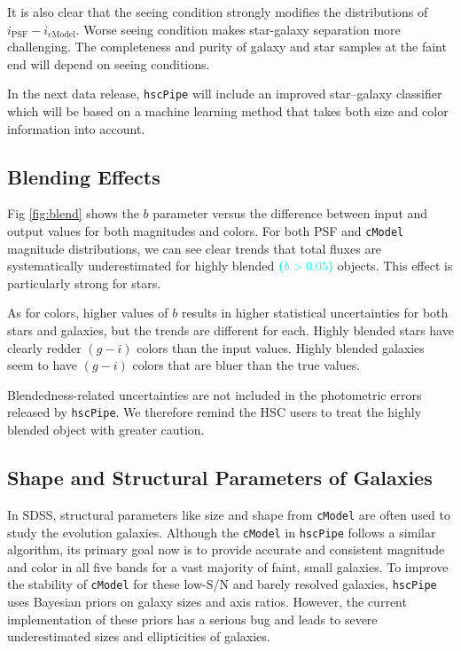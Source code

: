 \documentclass[useamsfonts]{pasj01}
\def\hscpipe{\texttt{hscPipe}}
\def\cmodel{\texttt{cModel}}
\def\s2n{{$\mathrm{S}/\mathrm{N}$}}
\newcommand{\song}[1]{\textcolor{cyan} {\textbf{#1}}}
\begin{document}
    It is also clear that the seeing condition strongly modifies the distributions
    of $i_{\mathrm{PSF}}-i_{\mathrm{cModel}}$. 
    Worse seeing condition makes star-galaxy separation more challenging. 
    The completeness and purity of galaxy and star samples at the faint end will 
    depend on seeing conditions.  

    In the next data release, \hscpipe{} will include an improved star--galaxy 
    classifier which will be based on a machine learning method that takes both 
    size and color information into account. 

\subsection{Blending Effects}
    \label{ssec:blendedness}

    Fig \ref{fig:blend} shows the $b$ parameter versus the difference between input and
    output values for both magnitudes and colors. 
    For both PSF and \cmodel{} magnitude distributions, we can see clear trends that 
    total fluxes are systematically underestimated for highly blended \song{($b>0.05$)} 
    objects.
    This effect is particularly strong for stars.
    
    As for colors, higher values of $b$ results in higher statistical uncertainties 
    for both stars and galaxies, but the trends are different for each.
    Highly blended stars have clearly redder $(g-i)$ colors than the input values. 
    Highly blended galaxies seem to have $(g-i)$ colors that are bluer than the 
    true values.

    Blendedness-related uncertainties are not included in the photometric errors 
    released by \hscpipe{}.
    We therefore remind the HSC users to treat the highly blended object with
    greater caution.

\subsection{Shape and Structural Parameters of Galaxies}
    \label{ssec:shape}

    In SDSS, structural parameters like size and shape from \cmodel{} are often used to 
    study the evolution galaxies.
    Although the \cmodel{} in \hscpipe{} follows a similar algorithm, its primary
    goal now is to provide accurate and consistent magnitude and color in all five
    bands for a vast majority of faint, small galaxies.
    To improve the stability of \cmodel{} for these low-\s2n{} and barely resolved
    galaxies, \hscpipe{} uses Bayesian priors on galaxy sizes and axis ratios. 
    However, the current implementation of these priors has a serious bug and leads 
    to severe underestimated sizes and ellipticities of galaxies.
    
\end{document}

